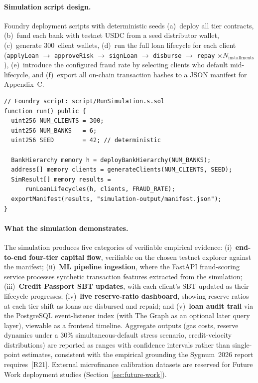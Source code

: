 \documentclass[12pt,a4paper]{report}
\begin{document}
\paragraph{Simulation script design.}
Foundry deployment scripts with deterministic seeds (a)~deploy all tier contracts, (b)~fund each bank with testnet USDC from a seed distributor wallet, (c)~generate 300~client wallets, (d)~run the full loan lifecycle for each client (\texttt{applyLoan} $\to$ \texttt{approveRisk} $\to$ \texttt{signLoan} $\to$ \texttt{disburse} $\to$ \texttt{repay} $\times N_\text{installments}$), (e)~introduce the configured fraud rate by selecting clients who default mid-lifecycle, and (f)~export all on-chain transaction hashes to a JSON manifest for Appendix~C.

\begin{lstlisting}[language=Solidity, caption={Foundry simulation entry-point (structure)}]
// Foundry script: script/RunSimulation.s.sol
function run() public {
  uint256 NUM_CLIENTS = 300;
  uint256 NUM_BANKS   = 6;
  uint256 SEED        = 42; // deterministic

  BankHierarchy memory h = deployBankHierarchy(NUM_BANKS);
  address[] memory clients = generateClients(NUM_CLIENTS, SEED);
  SimResult[] memory results =
      runLoanLifecycles(h, clients, FRAUD_RATE);
  exportManifest(results, "simulation-output/manifest.json");
}
\end{lstlisting}

\paragraph{What the simulation demonstrates.}
The simulation produces five categories of verifiable empirical evidence: (i)~\textbf{end-to-end four-tier capital flow}, verifiable on the chosen testnet explorer against the manifest; (ii)~\textbf{ML pipeline ingestion}, where the FastAPI fraud-scoring service processes synthetic transaction features extracted from the simulation; (iii)~\textbf{Credit Passport SBT updates}, with each client's SBT updated as their lifecycle progresses; (iv)~\textbf{live reserve-ratio dashboard}, showing reserve ratios at each tier shift as loans are disbursed and repaid; and (v)~\textbf{loan audit trail} via the PostgreSQL event-listener index (with The Graph as an optional later query layer), viewable as a frontend timeline. Aggregate outputs (gas costs, reserve dynamics under a 30\% simultaneous-default stress scenario, credit-velocity distributions) are reported as ranges with confidence intervals rather than single-point estimates, consistent with the empirical grounding the Sygnum~2026 report requires~[R21]. External microfinance calibration datasets are reserved for Future Work deployment studies (Section~\ref{sec:future-work}).
\end{document}
